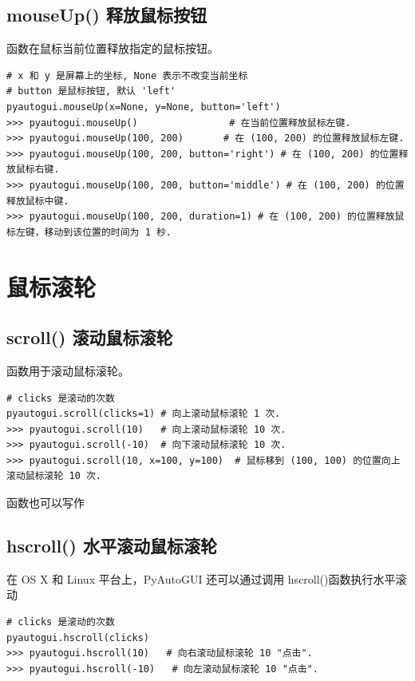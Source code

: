 \subsection{mouseUp() 释放鼠标按钮}
 函数在鼠标当前位置释放指定的鼠标按钮。
\begin{lstlisting}[style=demostyle,numbers=none]
# x 和 y 是屏幕上的坐标, None 表示不改变当前坐标
# button 是鼠标按钮, 默认 'left'
pyautogui.mouseUp(x=None, y=None, button='left')
>>> pyautogui.mouseUp()                # 在当前位置释放鼠标左键.
>>> pyautogui.mouseUp(100, 200)       # 在 (100, 200) 的位置释放鼠标左键.
>>> pyautogui.mouseUp(100, 200, button='right') # 在 (100, 200) 的位置释放鼠标右键.
>>> pyautogui.mouseUp(100, 200, button='middle') # 在 (100, 200) 的位置释放鼠标中键.
>>> pyautogui.mouseUp(100, 200, duration=1) # 在 (100, 200) 的位置释放鼠标左键，移动到该位置的时间为 1 秒.
\end{lstlisting}

\section{鼠标滚轮}
\subsection{scroll() 滚动鼠标滚轮}
 函数用于滚动鼠标滚轮。
\begin{lstlisting}[style=demostyle,numbers=none]
# clicks 是滚动的次数
pyautogui.scroll(clicks=1) # 向上滚动鼠标滚轮 1 次.
>>> pyautogui.scroll(10)   # 向上滚动鼠标滚轮 10 次.
>>> pyautogui.scroll(-10)  # 向下滚动鼠标滚轮 10 次.
>>> pyautogui.scroll(10, x=100, y=100)  # 鼠标移到 (100, 100) 的位置向上滚动鼠标滚轮 10 次.
\end{lstlisting}

 函数也可以写作

\subsection{hscroll() 水平滚动鼠标滚轮}
在 OS X 和 Linux 平台上，PyAutoGUI 还可以通过调用 hscroll()函数执行水平滚动
\begin{lstlisting}[style=demostyle,numbers=none]
# clicks 是滚动的次数
pyautogui.hscroll(clicks)
>>> pyautogui.hscroll(10)   # 向右滚动鼠标滚轮 10 "点击".
>>> pyautogui.hscroll(-10)   # 向左滚动鼠标滚轮 10 "点击".
\end{lstlisting}


